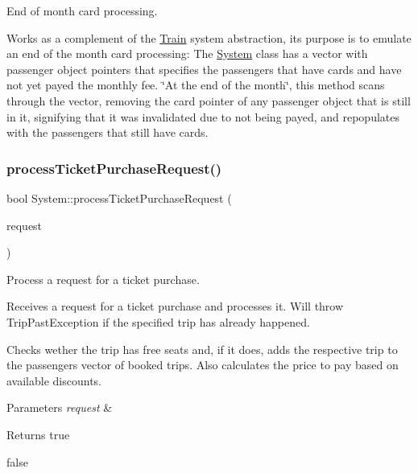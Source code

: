 End of month card processing. 

Works as a complement of the \mbox{\hyperlink{classTrain}{Train}} system abstraction, it\textquotesingle{}s purpose is to emulate an end of the month card processing\+: The \mbox{\hyperlink{classSystem}{System}} class has a vector with passenger object pointers that specifies the passengers that have cards and have not yet payed the monthly fee. \char`\"{}\+At the end of the month\char`\"{}, this method scans through the vector, removing the card pointer of any passenger object that is still in it, signifying that it was invalidated due to not being payed, and repopulates with the passengers that still have cards. \mbox{\label{classSystem_ac2b6f3d934b64f4fa56ffb1db1d261df}} 
\subsubsection{\texorpdfstring{process\+Ticket\+Purchase\+Request()}{processTicketPurchaseRequest()}}
{\footnotesize\ttfamily bool System\+::process\+Ticket\+Purchase\+Request (\begin{DoxyParamCaption}\item[{\mbox{\hyperlink{classTicketPurchaseRequest}{Ticket\+Purchase\+Request}} \&}]{request }\end{DoxyParamCaption})}



Process a request for a ticket purchase. 

Receives a request for a ticket purchase and processes it. Will throw Trip\+Past\+Exception if the specified trip has already happened.

Checks wether the trip has free seats and, if it does, adds the respective trip to the passenger\textquotesingle{}s vector of booked trips. Also calculates the price to pay based on available discounts.


\begin{DoxyParams}{Parameters}
{\em request} & \\
\hline
\end{DoxyParams}
\begin{DoxyReturn}{Returns}
true 

false 
\end{DoxyReturn}
\mbox{\label{classSystem_af31acdda711986978533367ce3a64276}} 
